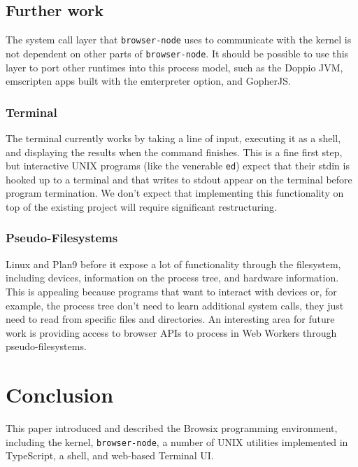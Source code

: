 \documentclass{acm_proc_article-sp}
\begin{document}
\subsection{Further work}

The system call layer that \texttt{browser-node} uses to communicate
with the kernel is not dependent on other parts of
\texttt{browser-node}.  It should be possible to use this layer to
port other runtimes into this process model, such as the Doppio JVM,
emscripten apps built with the emterpreter option, and GopherJS.

\subsubsection{Terminal}

The terminal currently works by taking a line of input, executing it
as a shell, and displaying the results when the command finishes.
This is a fine first step, but interactive UNIX programs (like the
venerable \texttt{ed}) expect that their stdin is hooked up to a
terminal and that writes to stdout appear on the terminal before
program termination.  We don't expect that implementing this
functionality on top of the existing project will require significant
restructuring.

\subsubsection{Pseudo-Filesystems}

Linux and Plan9 before it expose a lot of functionality through the
filesystem, including devices, information on the process tree, and
hardware information.  This is appealing because programs that want to
interact with devices or, for example, the process tree don't need to
learn additional system calls, they just need to read from specific
files and directories.  An interesting area for future work is
providing access to browser APIs to process in Web Workers through
pseudo-filesystems.

\section{Conclusion}

This paper introduced and described the Browsix programming
environment, including the kernel, \texttt{browser-node}, a number of
UNIX utilities implemented in TypeScript, a shell, and web-based
Terminal UI.




\balancecolumns
\end{document}
